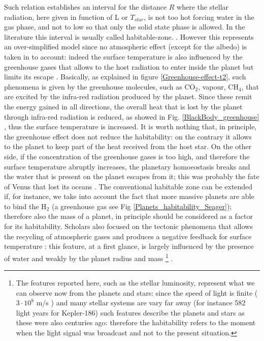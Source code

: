 \documentclass[
12pt, %
a4paper, %
oneside, %
headinclude,footinclude, %
BCOR5mm, %
]{scrartcl}
\begin{document}
Such relation establishes an interval for the distance $R$ where the stellar radiation, here given in function of L or $T_{star}$, is not too hot forcing water in the gas phase, and not to low so that only the solid state phase is allowed. In the literature this interval is usually called habitable-zone. \cite{kasting1993habitable}. However this represents an over-simplified model since no atmospheric effect (except for the albedo) is taken in to account: indeed the surface temperature is also influenced by the greenhouse gases that allows to the host radiation to enter inside the planet but limits its escape \cite{seager2013exoplanet,forget2014possible}. Basically, as explained in figure \ref{Greenhouse-effect-t2},  such phenomena is given by the greenhouse molecules, such as CO$_{2}$, vapour, CH$_{4}$, that are excited by the infra-red radiation produced by the planet. Since these remit the energy gained in all directions, the overall heat that is lost by the planet through infra-red radiation is reduced, as showed in Fig. \ref{BlackBody_greenhouse} \cite{pierrehumbert2011infrared}, thus the surface temperature is increased. It is worth nothing that, in principle, the greenhouse effect does not reduce the habitability: on the contrary it allows to the planet to keep part of the heat received from the host star. On the other side, if the concentration of the greenhouse gases is too high, and therefore the surface temperature abruptly increases, the planetary homoeostasis  \cite{lovelock1974atmospheric,lovelock1982life,caldeira1992life} breaks and the water that is present on the planet escapes from it; this was probably the fate of Venus that lost its oceans \cite{way2016venus,luger2015extreme,seager2013exoplanet}. The conventional habitable zone can be extended if, for instance, we take into account the fact that more massive planets are able to bind the H$_{2}$ (a greenhouse gas see Fig \ref{Planets_habitability_Seager}); therefore also the mass of a planet, in principle should be considered as a factor for its habitability. Scholars \cite{tackley2012habitable} also focused on the tectonic phenomena that allows the recycling of atmospheric gases and produces a negative feedback for surface temperature \cite{walker1981negative}: this feature, at a first glance, is largely influenced by the presence of water \cite{korenaga2010likelihood,o2007geological} and weakly by the planet radius \cite{o2007geological} and mass \cite{korenaga2010likelihood}\footnote{The features reported here, such as the stellar luminosity, represent what we can observe now from the planets and stars: since the speed of light is finite ($3\cdot10^{8}$ m/s ) and many stellar systems are vary far away (for instance 582 light years for Kepler-186) such features describe the planets and stars as these were also centuries ago: therefore the habitability refers to the moment when the light signal was broadcast and not to the present situation.} .  
  
\end{document}
